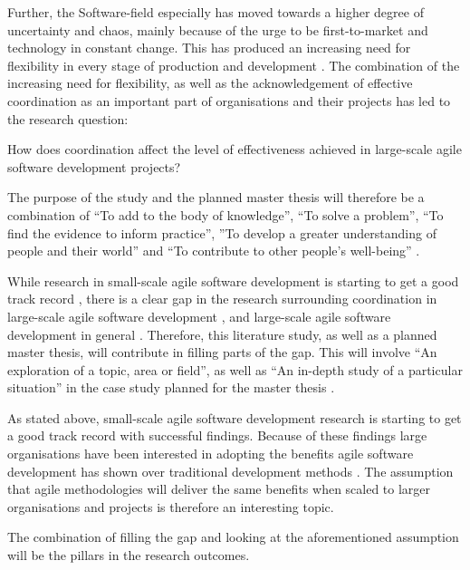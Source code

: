 Further, the Software-field especially has moved towards a higher degree of uncertainty and chaos, mainly because of the urge to be first-to-market and technology in constant change. This has produced an increasing need for flexibility in every stage of production and development \cite{Pikkarainen2008, Beck2004, Borjesson2004}. The combination of the increasing need for flexibility, as well as the acknowledgement of effective coordination as an important part of organisations and their projects has led to the research question:

\begin{fancyquotes}
How does coordination affect the level of effectiveness achieved in large-scale agile software development projects?
\end{fancyquotes}


The purpose of the study and the planned master thesis will therefore be a combination of ``To add to the body of knowledge'', ``To solve a problem'', ``To find the evidence to inform practice'', ''To develop a greater understanding of people and their world'' and ``To contribute to other people's well-being'' \cite{Oates2006}.

While research in small-scale agile software development is starting to get a good track record \cite{Paasivaara2012, Haaster2014}, there is a clear gap in the research surrounding coordination in large-scale agile software development \cite{Pikkarainen2008, Paasivaara2012, Dingsoyr2013b}, and large-scale agile software development in general \cite{Freudenberg2010, Haaster2014}. Therefore, this literature study, as well as a planned master thesis, will contribute in filling parts of the gap. This will involve ``An exploration of a topic, area or field'', as well as ``An in-depth study of a particular situation'' in the case study planned for the master thesis \cite{Oates2006}.

As stated above, small-scale agile software development research is starting to get a good track record with successful findings. Because of these findings large organisations have been interested in adopting the benefits agile software development has shown over traditional development methods \cite{Com2013, Vlietland2015, Agerfalk2006, Paasivaara2012}. The assumption that agile methodologies will deliver the same benefits when scaled to larger organisations and projects is therefore an interesting topic.

The combination of filling the gap and looking at the aforementioned assumption will be the pillars in the research outcomes.

